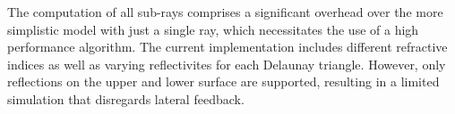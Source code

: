 The computation of all sub-rays comprises a significant overhead over the more
simplistic model with just a single ray, which necessitates the use of a high
performance algorithm.  The current implementation includes different refractive
indices as well as varying reflectivites for each Delaunay triangle. However,
only reflections on the upper and lower surface are supported, resulting in a
limited simulation that disregards lateral feedback. 
